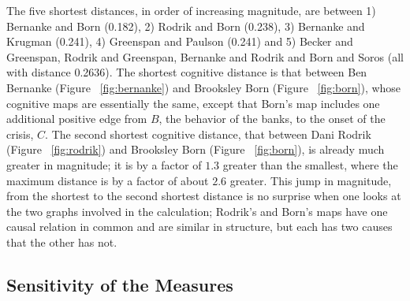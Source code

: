 \documentclass[12pt]{article}
\begin{document}
The five shortest distances, in order of increasing magnitude, are between 1) Bernanke and Born (0.182), 2) Rodrik and Born (0.238), 3) Bernanke and Krugman (0.241), 4) Greenspan and Paulson (0.241) and 5) Becker and Greenspan, Rodrik and Greenspan, Bernanke and Rodrik and Born and Soros (all with distance 0.2636). The shortest cognitive distance is that between Ben Bernanke (Figure ~\ref{fig:bernanke}) and Brooksley Born (Figure ~\ref{fig:born}), whose cognitive maps are essentially the same, except that Born's map includes one additional positive edge from $B$, the behavior of the banks, to the onset of the crisis, $C$. The second shortest cognitive distance, that between Dani Rodrik (Figure ~\ref{fig:rodrik}) and Brooksley Born (Figure ~\ref{fig:born}), is already much greater in magnitude; it is by a factor of $1.3$ greater than the smallest, where the maximum distance is by a factor of about $2.6$ greater. This jump in magnitude, from the shortest to the second shortest distance is no surprise when one looks at the two graphs involved in the calculation; Rodrik's and Born's maps have one causal relation in common and are similar in structure, but each has two causes that the other has not.

\subsection*{Sensitivity of the Measures}
\end{document}
